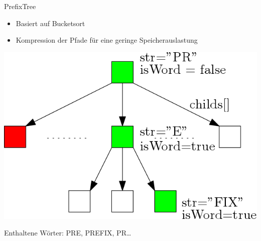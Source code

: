 \documentclass[11pt, xcolor=dvipsnames]{beamer}
\begin{document}
	
	\begin{frame}{PrefixTree}
		\begin{itemize}
			\item Basiert auf Bucketsort\\						
			\item Kompression der Pfade für eine geringe Speicherauslastung
		\end{itemize}
		\begin{center}
		\includegraphics[scale=0.3]{pics/prefixtree.png}
		
		Enthaltene Wörter: PRE, PREFIX, PR\ldots
		\end{center}
		

	\end{frame}
	
\end{document}
